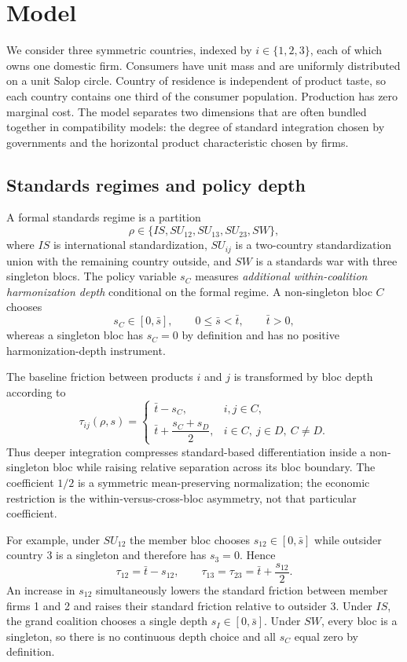\section{Model}\label{sec:model}

We consider three symmetric countries, indexed by $i\in\{1,2,3\}$, each of which owns one domestic firm. Consumers have unit mass and are uniformly distributed on a unit Salop circle. Country of residence is independent of product taste, so each country contains one third of the consumer population. Production has zero marginal cost. The model separates two dimensions that are often bundled together in compatibility models: the degree of standard integration chosen by governments and the horizontal product characteristic chosen by firms.

\subsection{Standards regimes and policy depth}

A formal standards regime is a partition
\[
\rho\in\{IS,SU_{12},SU_{13},SU_{23},SW\},
\]
where $IS$ is international standardization, $SU_{ij}$ is a two-country standardization union with the remaining country outside, and $SW$ is a standards war with three singleton blocs. The policy variable $s_C$ measures \emph{additional within-coalition harmonization depth} conditional on the formal regime. A non-singleton bloc $C$ chooses
\[
s_C\in[0,\bar s],
\qquad
0\leq \bar s<\bar t,
\qquad \bar t>0,
\]
whereas a singleton bloc has $s_C=0$ by definition and has no positive harmonization-depth instrument.

The baseline friction between products $i$ and $j$ is transformed by bloc depth according to
\begin{equation}\label{eq:tau-map}
\tau_{ij}(\rho,s)=
\begin{cases}
\bar t-s_C, & i,j\in C,\\[2mm]
\bar t+\dfrac{s_C+s_D}{2}, & i\in C,\ j\in D,\ C\neq D.
\end{cases}
\end{equation}
Thus deeper integration compresses standard-based differentiation inside a non-singleton bloc while raising relative separation across its bloc boundary. The coefficient $1/2$ is a symmetric mean-preserving normalization; the economic restriction is the within-versus-cross-bloc asymmetry, not that particular coefficient.

For example, under $SU_{12}$ the member bloc chooses $s_{12}\in[0,\bar s]$ while outsider country 3 is a singleton and therefore has $s_3=0$. Hence
\[
\tau_{12}=\bar t-s_{12},\qquad
\tau_{13}=\tau_{23}=\bar t+\frac{s_{12}}{2}.
\]
An increase in $s_{12}$ simultaneously lowers the standard friction between member firms 1 and 2 and raises their standard friction relative to outsider 3. Under $IS$, the grand coalition chooses a single depth $s_I\in[0,\bar s]$. Under $SW$, every bloc is a singleton, so there is no continuous depth choice and all $s_C$ equal zero by definition.

